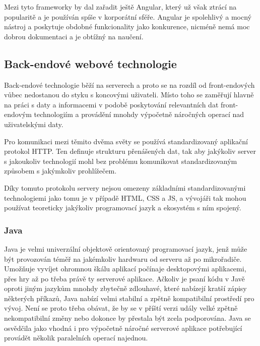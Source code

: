 \begin{itemize}
\begin{itemize}
		Mezi tyto frameworky by dal zařadit ještě Angular, který už však ztrácí na popularitě a je používán spíše v
		korporátní sféře.
		Angular je spolehlivý a mocný nástroj a poskytuje obdobné funkcionality jako konkurence,
		nicméně nemá moc dobrou dokumentaci a je obtížný na naučení. \cite{react_vs_angular}

	\subsection{Back-endové webové technologie}

	Back-endové technologie běží na serverech a proto se na rozdíl od front-endových vůbec nedostanou do styku s koncovými uživateli.
	Místo toho se zaměřují hlavně na práci s daty a informacemi v podobě poskytování relevantních dat front-endovým
	technologiím a provádění mnohdy výpočetně náročných operací nad uživatelskými daty.

	Pro komunikaci mezi těmito dvěma světy se používá standardizovaný aplikační protokol \noindent\Ac{HTTP}.
	Ten definuje strukturu přenášených dat, tak aby jakýkoliv server s jakoukoliv technologií mohl bez problému komunikovat
	standardizovaným způsobem s jakýmkoliv prohlížečem. \cite{http}

	Díky tomuto protokolu servery nejsou omezeny základními standardizovanými technologiemi jako tomu je v případě
	\Ac{HTML}, \Ac{CSS} a \ac{JS}, a vývojáři tak mohou používat teoreticky jakýkoliv programovací jazyk a ekosystém s ním
	spojený.

		\subsubsection{Java}

		Java je velmi univerzální objektově orientovaný programovací jazyk, jenž může být provozován téměř na jakémkoliv
		hardwaru od serveru až po mikrořadiče.
		Umožňuje vyvíjet ohromnou škálu aplikací počínaje desktopovými aplikacemi, přes hry až po třeba právě ty
		serverové aplikace. \cite{java}
		Ačkoliv je psaní kódu v Javě oproti jiným jazykům mnohdy zbytečně zdlouhavé, které nabízejí kratší zápisy
		některých příkazů, Java nabízí velmi stabilní a zpětně kompatibilní prostředí pro vývoj.
		Není se proto třeba obávat, že by se v příští verzi udály velké zpětně nekompatibilní změny nebo dokonce
		by přestala být zcela podporována.
		Java se osvědčila jako vhodná i pro výpočetně náročné serverové aplikace potřebující provádět několik paralelních
		operací najednou.


\end{itemize}
\end{itemize}
